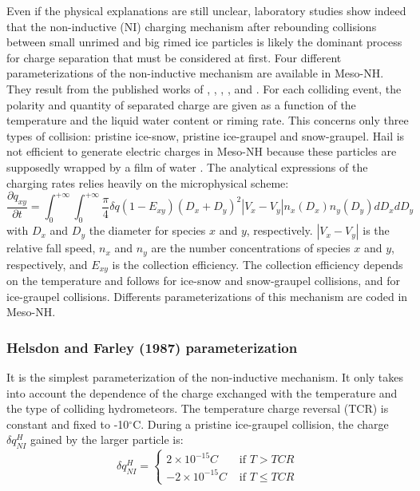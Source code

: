 Even if the physical explanations are still unclear, laboratory studies \citep[][among others]{Takahashi-1978,Jayaratne-1983,Saunders-1991,Avila-1995,Saunders-1998} show indeed that the non-inductive (NI) charging mechanism after rebounding collisions between small unrimed and big rimed ice particles is likely the dominant process for charge separation that must be considered at first. 
Four different parameterizations of the non-inductive mechanism are available in Meso-NH.
They result from the published works of \citet{Takahashi-1978}, \citet{Gardiner-1985}, \citet{Saunders-1991}, \citet{Saunders-1998}, \citet{Tsenova-2009} and \citet{Tsenova-2011}. 
For each colliding event, the polarity and quantity of separated charge are given as a function of the temperature and the liquid water content or riming rate. 
This concerns only three types of collision: pristine ice-snow, pristine ice-graupel and snow-graupel. 
Hail is not efficient to generate electric charges in Meso-NH because these particles are supposedly wrapped by a film of water \citep{Saunders-Brooks-1992}. 
The analytical expressions of the charging rates relies heavily on the microphysical scheme:
\begin{equation}
 \frac{\partial q_{xy}}{\partial t} = \int _0 ^{+\infty} \int _0 ^{+\infty} \frac{\pi}{4} \delta q (1 - E_{xy})(D_x + D_y)^2 |V_x - V_y| n_x(D_x) n_y(D_y) dD_x dD_y
\end{equation}
with $D_x$ and $D_y$ the diameter for species $x$ and $y$, respectively.
$|V_x-V_y|$ is the relative fall speed, $n_x$ and $n_y$ are the number concentrations of species $x$ and $y$, respectively, and $E_{xy}$ is the collection efficiency.
The collection efficiency depends on the temperature and follows \citet{Kajikawa-1989} for ice-snow and snow-graupel collisions, and \citet{Mansell-2005} for ice-graupel collisions.
Differents parameterizations of this mechanism are coded in Meso-NH.

\subsubsection{Helsdon and Farley (1987) parameterization}

It is the simplest parameterization of the non-inductive mechanism.
It only takes into account the dependence of the charge exchanged with the temperature and the type of colliding hydrometeors.
The temperature charge reversal (TCR) is constant and fixed to -10$^{\circ}$C.
During a pristine ice-graupel collision, the charge $\delta q_{NI} ^H$ gained by the larger particle is:
\begin{equation}
  \delta q_{NI} ^{H} = \left\{
  \begin{array}{rl}
    2 \times 10^{-15} C & \mbox{ if } T > TCR \\
    -2 \times 10^{-15} C & \mbox{ if } T \leq TCR
  \end{array}
  \right.
\end{equation}

